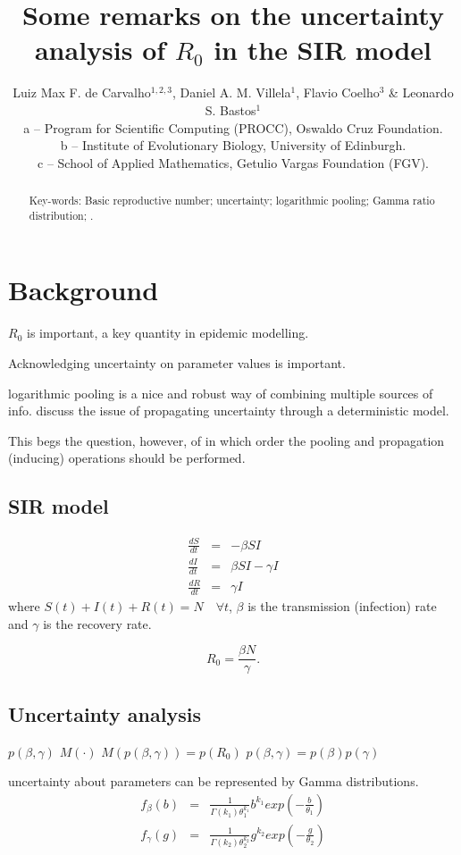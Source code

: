 \documentclass[a4paper, notitlepage, 10pt]{article}
\title{\vspace{-9ex}\centering \bf Some remarks on the uncertainty analysis of $R_0$ in the SIR model}
\author{
Luiz Max F. de Carvalho$^{1,2,3}$, Daniel A. M. Villela$^1$, Flavio Coelho$^3$ \& Leonardo S. Bastos$^1$ \\
a -- Program for Scientific Computing (PROCC), Oswaldo Cruz Foundation. \\
b -- Institute of Evolutionary Biology, University of Edinburgh.\\
c -- School of Applied Mathematics, Getulio Vargas Foundation (FGV).
}
\date{}
\begin{document}
\maketitle

\begin{abstract}

Key-words: Basic reproductive number; uncertainty; logarithmic pooling; Gamma ratio distribution; . 
\end{abstract}

\section{Background}

$R_0$ is important, a key quantity in epidemic modelling.

Acknowledging uncertainty on parameter values is important.

logarithmic pooling is a nice and robust way of combining multiple sources of info.
\cite{poole2000} discuss the issue of propagating uncertainty through a deterministic model.


This begs the question, however, of in which order the pooling and propagation (inducing) operations should be performed.


\subsection{SIR model}

\begin{eqnarray*}
\frac{dS}{dt}&=& - \beta SI\\
\frac{dI}{dt}&=&  \beta SI - \gamma I\\
\frac{dR}{dt}&=& \gamma I 
\end{eqnarray*} 
where  $S(t) + I(t) + R(t) = N \quad \forall t$, $\beta$ is the transmission (infection) rate and $\gamma$ is the recovery rate.

\begin{equation}
\label{eq:r0def}
R_0 = \frac{\beta N}{\gamma}. 
\end{equation}

\subsection{Uncertainty analysis}

$p(\beta, \gamma)$
$M(\cdot)$
$M(p(\beta, \gamma)) = p(R_0)$
$p(\beta, \gamma) = p(\beta)p(\gamma)$

uncertainty about parameters can be represented by Gamma distributions.
\begin{eqnarray*}
f_{\beta}(b) &=& \frac{1}{\Gamma(k_1)\theta_1^{k_1}} b^{k_1} exp (- \frac{b}{\theta_1} ) \\
f_{\gamma}(g) &=& \frac{1}{\Gamma(k_2)\theta_2^{k_2}} g^{k_2} exp (- \frac{g}{\theta_2})
\end{eqnarray*}
\end{document}
